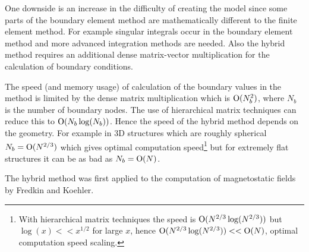 One downside is an increase in the difficulty of creating the model since some parts of the boundary element method are mathematically different to the finite element method. For example singular integrals occur in the boundary element method and more advanced integration methods are needed. Also the hybrid method requires an additional dense matrix-vector multiplication for the calculation of boundary conditions.

The speed (and memory usage) of calculation of the boundary values in the method is limited by the dense matrix multiplication which is $\text{O}(N_b^2)$, where $N_b$ is the number of boundary nodes. The use of hierarchical matrix techniques can reduce this to $\text{O}(N_b \log(N_b))$.\cite{Knittel2009} Hence the speed of the hybrid method depends on the geometry. For example in 3D structures which are roughly spherical $N_b = \text{O}(N^{2/3})$ which gives optimal computation speed\footnote{With hierarchical matrix techniques the speed is $\text{O}(N^{2/3}\log(N^{2/3}))$ but $\log(x) << x^{1/2}$ for large $x$, hence $\text{O}(N^{2/3}\log(N^{2/3})) << \text{O}(N)$, \ie optimal computation speed scaling.} but for extremely flat structures it can be as bad as $N_b = \text{O}(N)$.

The hybrid method was first applied to the computation of magnetostatic fields by Fredkin and Koehler.\cite{Fredkin1990}





